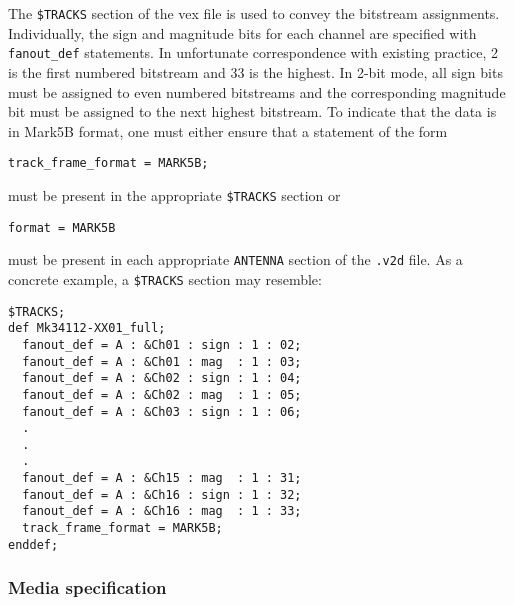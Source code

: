 The {\tt \$TRACKS} section of the vex file is used to convey the bitstream assignments. 
Individually, the sign and magnitude bits for each channel are specified with {\tt fanout\_def} statements. 
In unfortunate correspondence with existing practice, 2 is the first numbered bitstream and 33 is the highest. 
In 2-bit mode, all sign bits must be assigned to even numbered bitstreams and the corresponding magnitude bit must be assigned to the next highest bitstream. 
To indicate that the data is in Mark5B format, one must either ensure that a statement of the form 

\indent
{\tt track\_frame\_format = MARK5B;}

\noindent
must be present in the appropriate {\tt \$TRACKS} section or

\indent
{\tt format = MARK5B}

\noindent
must be present in each appropriate {\tt ANTENNA} section of the {\tt .v2d} file. 
As a concrete example, a {\tt \$TRACKS} section may resemble:

\begin{verbatim}
$TRACKS;
def Mk34112-XX01_full;
  fanout_def = A : &Ch01 : sign : 1 : 02;
  fanout_def = A : &Ch01 : mag  : 1 : 03;
  fanout_def = A : &Ch02 : sign : 1 : 04;
  fanout_def = A : &Ch02 : mag  : 1 : 05;
  fanout_def = A : &Ch03 : sign : 1 : 06;
  .
  .
  .
  fanout_def = A : &Ch15 : mag  : 1 : 31;
  fanout_def = A : &Ch16 : sign : 1 : 32;
  fanout_def = A : &Ch16 : mag  : 1 : 33;
  track_frame_format = MARK5B;
enddef;

\end{verbatim}

\subsubsection{Media specification}

